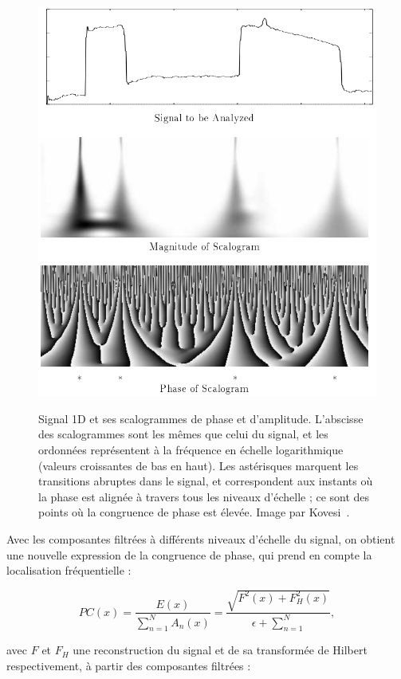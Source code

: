 \begin{figure}
    \centering
    \includegraphics[width=.85\textwidth]{contenu/resources/images/phase_congruence_scalogram}
    \label{fig:phase-congruence-scalogram}
    \caption[Scalogramme d'un signal présentant des points caractéristiques]{Signal 1D et ses scalogrammes de phase et d'amplitude. L'abscisse des scalogrammes sont les mêmes que celui du signal, et les ordonnées représentent à la fréquence en échelle logarithmique (valeurs croissantes de bas en haut). Les astérisques marquent les transitions abruptes dans le signal, et correspondent aux instants où la phase est alignée à travers tous les niveaux d'échelle ; ce sont des points où la congruence de phase est élevée. Image par Kovesi~\cite{kovesi_image_1995}.}
\end{figure}

Avec les composantes filtrées à différents niveaux d'échelle du signal, on obtient une nouvelle expression de la congruence de phase, qui prend en compte la localisation fréquentielle :

\begin{equation}
    PC(x) = \frac{E(x)}{\sum_{n=1}^{N} A_n(x)} = \frac{\sqrt{F^2(x)+F_H^2(x)}}{\epsilon + \sum_{n=1}^{N}},
\end{equation}

avec $F$ et $F_H$ une reconstruction du signal et de sa transformée de Hilbert respectivement, à partir des composantes filtrées :

